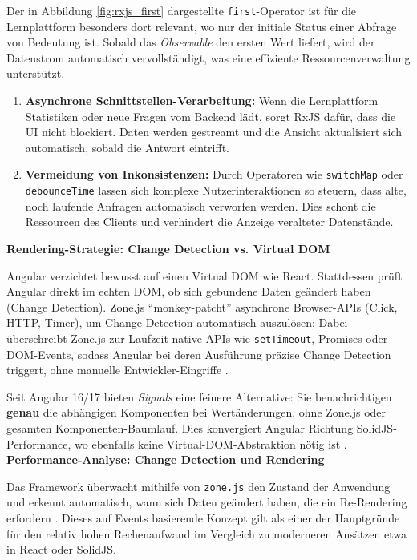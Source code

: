 Der in Abbildung \ref{fig:rxjs_first} dargestellte \texttt{first}-Operator ist für die Lernplattform besonders dort relevant, wo nur der initiale Status einer Abfrage von Bedeutung ist. Sobald das \textit{Observable} den ersten Wert liefert, wird der Datenstrom automatisch vervollständigt, was eine effiziente Ressourcenverwaltung unterstützt.


\begin{enumerate}
\item \textbf{Asynchrone Schnittstellen-Verarbeitung:} Wenn die Lernplattform Statistiken oder neue Fragen vom Backend lädt, sorgt RxJS dafür, dass die UI nicht blockiert. Daten werden gestreamt und die Ansicht aktualisiert sich automatisch, sobald die Antwort eintrifft.
\item \textbf{Vermeidung von Inkonsistenzen:} Durch Operatoren wie \texttt{switchMap} oder \texttt{debounceTime} lassen sich komplexe Nutzerinteraktionen so steuern, dass alte, noch laufende Anfragen automatisch verworfen werden. Dies schont die Ressourcen des Clients und verhindert die Anzeige veralteter Datenstände.
\end{enumerate}


\textbf{Rendering-Strategie: Change Detection vs. Virtual DOM}


Angular verzichtet bewusst auf einen Virtual DOM wie React. Stattdessen prüft Angular direkt im echten DOM, ob sich gebundene Daten geändert haben (Change Detection). Zone.js ``monkey-patcht'' asynchrone Browser-APIs (Click, HTTP, Timer), um Change Detection automatisch auszulösen: Dabei überschreibt Zone.js zur Laufzeit native APIs wie \texttt{setTimeout}, Promises oder DOM-Events, sodass Angular bei deren Ausführung präzise Change Detection triggert, ohne manuelle Entwickler-Eingriffe \cite{web:3}.


Seit Angular 16/17 bieten \textit{Signals} eine feinere Alternative: Sie benachrichtigen \textbf{genau} die abhängigen Komponenten bei Wertänderungen, ohne Zone.js oder gesamten Komponenten-Baumlauf. Dies konvergiert Angular Richtung SolidJS-Performance, wo ebenfalls keine Virtual-DOM-Abstraktion nötig ist \cite{AngularSignalsGuide}.
\vspace{0.7cm}
\textbf{Performance-Analyse: Change Detection und Rendering}


Das Framework überwacht mithilfe von \texttt{zone.js} den Zustand der Anwendung und erkennt automatisch, wann sich Daten geändert haben, die ein Re-Rendering erfordern \cite{AngularHistory}. Dieses auf Events basierende Konzept gilt als einer der Hauptgründe für den relativ hohen Rechenaufwand im Vergleich zu moderneren Ansätzen etwa in React oder SolidJS.


